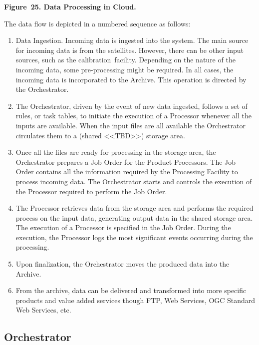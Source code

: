 \documentclass[a4paper]{article}
\newcounter{saveenum}
\newcommand\liststyleLFOxxxiii{%
\renewcommand\theenumi{\arabic{enumi}}
\renewcommand\theenumii{\alph{enumii}}
\renewcommand\theenumiii{\roman{enumiii}}
\renewcommand\theenumiv{\arabic{enumiv}}
\renewcommand\labelenumi{\theenumi.}
\renewcommand\labelenumii{\theenumii.}
\renewcommand\labelenumiii{\theenumiii.}
\renewcommand\labelenumiv{\theenumiv.}
}
\begin{document}
{\centering\bfseries
\label{bkm:Ref378074782}Figure\ 25. Data Processing in Cloud.
\par}


\bigskip

The data flow is depicted in a numbered sequence as follows:

\liststyleLFOxxxiii
\setcounter{saveenum}{\value{enumi}}
\begin{enumerate}
\setcounter{enumi}{\value{saveenum}}
\item Data Ingestion. Incoming data is ingested into the system. The
main source for incoming data is from the satellites. However, there
can be other input sources, such as the calibration\ facility.
Depending on the nature of the incoming data, some pre-processing might
be required. In all cases, the incoming data is incorporated to the
Archive. This operation is directed by the Orchestrator.
\item The Orchestrator, driven by the event of new data ingested,
follows a set of rules, or task tables, to initiate the execution of a
Processor whenever all the inputs are available. When the input files
are all available the Orchestrator circulates them to a (shared
{\textless}{\textless}TBD{\textgreater}{\textgreater}) storage area.
\item Once all the files are ready for processing in the storage area,
the Orchestrator prepares a Job Order for the Product Processors. The
Job Order contains all the information required by the Processing
Facility to process incoming data. The Orchestrator starts and controls
the execution of the Processor required to perform the Job Order.\ 
\item The Processor retrieves data from the storage area and performs
the required process on the input data, generating output data in the
shared storage area. The execution of a Processor is specified in the
Job Order. During the execution, the Processor logs the most
significant events occurring during the processing.
\item Upon finalization, the Orchestrator moves the produced data into
the Archive.
\item From the archive, data can be delivered and transformed into more
specific products and value added services though FTP, Web Services,
OGC Standard Web Services, etc.\ 
\end{enumerate}

\bigskip

\subsection[Orchestrator]{Orchestrator}
\hypertarget{Toc381777211}{}
\bigskip
\end{document}
